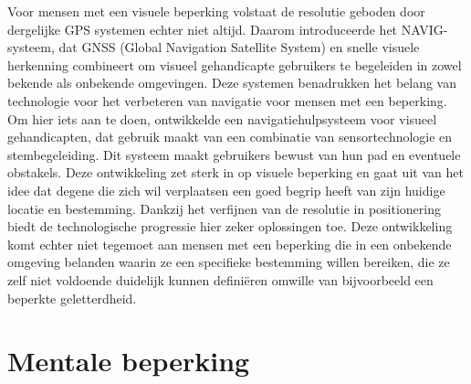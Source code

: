 Voor mensen met een visuele beperking volstaat de resolutie geboden door dergelijke GPS systemen echter niet altijd. Daarom introduceerde \textcite{Katz2010} het NAVIG-systeem, dat GNSS (Global Navigation Satellite System) en snelle visuele herkenning combineert om visueel gehandicapte gebruikers te begeleiden in zowel bekende als onbekende omgevingen. Deze systemen benadrukken het belang van technologie voor het verbeteren van navigatie voor mensen met een beperking. Om hier iets aan te doen, ontwikkelde  
\textcite{Lakde2015} een navigatiehulpsysteem voor visueel gehandicapten, dat gebruik maakt van een combinatie van sensortechnologie en stembegeleiding. Dit systeem maakt gebruikers bewust van hun pad en eventuele obstakels. Deze ontwikkeling zet sterk in op visuele beperking en gaat uit van het idee dat degene die zich wil verplaatsen een goed begrip heeft van zijn huidige locatie en bestemming. Dankzij het verfijnen van de resolutie in positionering biedt de technologische progressie hier zeker oplossingen toe. Deze ontwikkeling komt echter niet tegemoet aan mensen met een beperking die in een onbekende omgeving belanden waarin ze een specifieke bestemming willen bereiken, die ze zelf niet voldoende duidelijk kunnen definiëren omwille van bijvoorbeeld een beperkte geletterdheid.

\section{Mentale beperking}
\label{sec:mentale-beperking}

